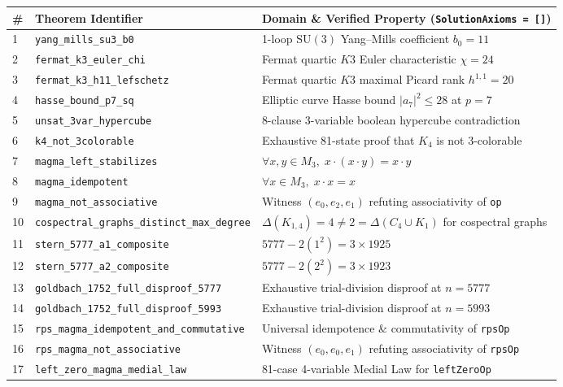 \documentclass[11pt,a4paper]{article}
\begin{document}
\begin{table}[htbp]
\centering
\small
\begin{tabular}{@{}lll@{}}
\toprule
\textbf{\#} & \textbf{Theorem Identifier} & \textbf{Domain \& Verified Property (\texttt{SolutionAxioms = []})} \\
\midrule
1 & \texttt{yang\_mills\_su3\_b0} & 1-loop $\mathrm{SU}(3)$ Yang--Mills coefficient $b_0 = 11$ \\
2 & \texttt{fermat\_k3\_euler\_chi} & Fermat quartic $K3$ Euler characteristic $\chi = 24$ \\
3 & \texttt{fermat\_k3\_h11\_lefschetz} & Fermat quartic $K3$ maximal Picard rank $h^{1,1} = 20$ \\
4 & \texttt{hasse\_bound\_p7\_sq} & Elliptic curve Hasse bound $|a_7|^2 \le 28$ at $p=7$ \\
5 & \texttt{unsat\_3var\_hypercube} & 8-clause 3-variable boolean hypercube contradiction \\
6 & \texttt{k4\_not\_3colorable} & Exhaustive 81-state proof that $K_4$ is not 3-colorable \\
7 & \texttt{magma\_left\_stabilizes} & $\forall x, y \in M_3,\; x \cdot (x \cdot y) = x \cdot y$ \\
8 & \texttt{magma\_idempotent} & $\forall x \in M_3,\; x \cdot x = x$ \\
9 & \texttt{magma\_not\_associative} & Witness $(e_0, e_2, e_1)$ refuting associativity of \texttt{op} \\
10 & \texttt{cospectral\_graphs\_distinct\_max\_degree} & $\Delta(K_{1,4}) = 4 \neq 2 = \Delta(C_4 \cup K_1)$ for cospectral graphs \\
11 & \texttt{stern\_5777\_a1\_composite} & $5777 - 2(1^2) = 3 \times 1925$ \\
12 & \texttt{stern\_5777\_a2\_composite} & $5777 - 2(2^2) = 3 \times 1923$ \\
13 & \texttt{goldbach\_1752\_full\_disproof\_5777} & Exhaustive trial-division disproof at $n = 5777$ \\
14 & \texttt{goldbach\_1752\_full\_disproof\_5993} & Exhaustive trial-division disproof at $n = 5993$ \\
15 & \texttt{rps\_magma\_idempotent\_and\_commutative} & Universal idempotence \& commutativity of \texttt{rpsOp} \\
16 & \texttt{rps\_magma\_not\_associative} & Witness $(e_0, e_0, e_1)$ refuting associativity of \texttt{rpsOp} \\
17 & \texttt{left\_zero\_magma\_medial\_law} & 81-case 4-variable Medial Law for \texttt{leftZeroOp} \\

\end{tabular}
\end{table}
\end{document}

